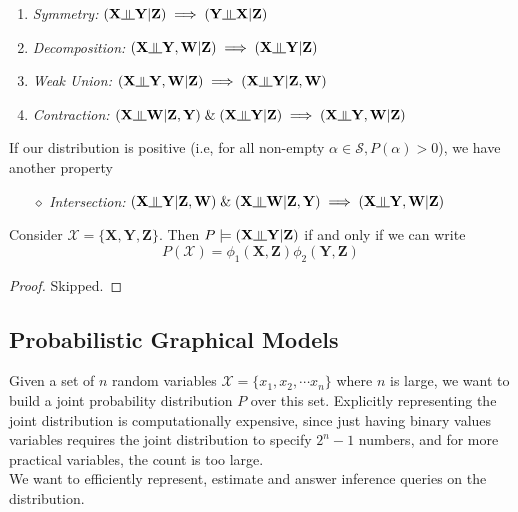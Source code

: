\begin{enumerate}
	\item \textit{Symmetry:} $(\mathbf X \ind \mathbf Y|\mathbf Z) \implies (\mathbf Y \ind \mathbf X|\mathbf Z)$
	\item \textit{Decomposition:} $(\mathbf X \ind \mathbf{Y, W}|\mathbf Z) \implies (\mathbf X \ind \mathbf Y|\mathbf{Z})$
	\item \textit{Weak Union:} $(\mathbf X \ind \mathbf Y, \mathbf W|\mathbf Z) \implies (\mathbf X \ind \mathbf Y|\mathbf Z,  \mathbf W)$
	\item \textit{Contraction:} $(\mathbf X \ind \mathbf W|\mathbf Z, \mathbf Y)\; \& \;(\mathbf X \ind \mathbf Y|\mathbf Z) \implies (\mathbf X \ind \mathbf Y, \mathbf W|\mathbf Z)$
\end{enumerate}
If our distribution is positive (i.e, for all non-empty $\alpha \in \mathcal S, P(\alpha) > 0$), we have another property
\begin{itemize}[leftmargin=1cm]
	\item[$\diamond$] \textit{Intersection:}  $(\mathbf X \ind \mathbf Y|\mathbf Z, \mathbf W)\; \& \;(\mathbf X \ind \mathbf W|\mathbf Z, \mathbf Y) \implies (\mathbf X \ind \mathbf Y, \mathbf W|\mathbf Z)$
\end{itemize}
\begin{thm}\label{thm:factor}
Consider $\mathcal{X} = \mathbf{\{X, Y, Z\}}$. Then $P\models (\mathbf X \ind \mathbf Y | \mathbf Z)$ if and only if we can write 
\begin{equation}
P(\mathcal X) = \phi_1(\mathbf{X, Z})\phi_2(\mathbf{Y, Z})
\end{equation}
\end{thm}
\begin{proof}
Skipped.
\end{proof}
\subsection{Probabilistic Graphical Models}
Given a set of $n$ random variables $\mathcal{X} = \{x_1, x_2, \cdots x_n\}$ where $n$ is large, we want to build a joint probability distribution $P$ over this set. Explicitly representing the joint distribution is computationally expensive, since just having binary values variables requires the joint distribution to specify $2^n-1$ numbers, and for more practical variables, the count is too large. \\
We want to efficiently represent, estimate and answer inference queries on the distribution.
